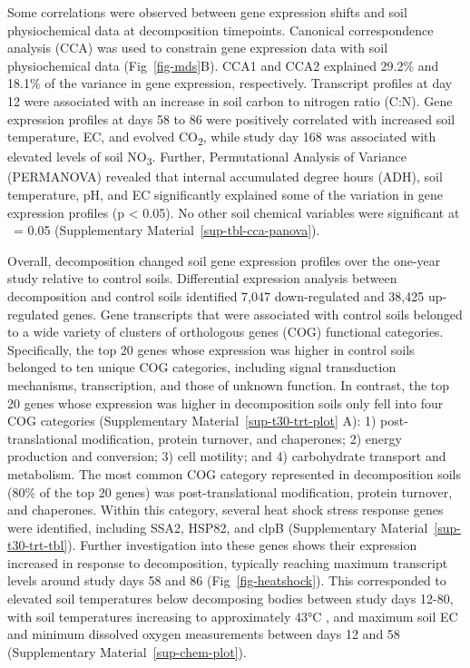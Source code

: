 \documentclass[
  sn-nature,
  lineno, referee]{sn-jnl}
\begin{document}
Some correlations were observed between gene expression shifts and soil
physiochemical data at decomposition timepoints. Canonical
correspondence analysis (CCA) was used to constrain gene expression data
with soil physiochemical data (Fig~\ref{fig-mds}B). CCA1 and CCA2
explained 29.2\% and 18.1\% of the variance in gene expression,
respectively. Transcript profiles at day 12 were associated with an
increase in soil carbon to nitrogen ratio (C:N). Gene expression
profiles at days 58 to 86 were positively correlated with increased soil
temperature, EC, and evolved CO\textsubscript{2}, while study day 168
was associated with elevated levels of soil NO\textsubscript{3}.
Further, Permutational Analysis of Variance (PERMANOVA) revealed that
internal accumulated degree hours (ADH), soil temperature, pH, and EC
significantly explained some of the variation in gene expression
profiles (p \textless{} 0.05). No other soil chemical variables were
significant at \textalpha~= 0.05
(Supplementary Material~\ref{sup-tbl-cca-panova}).

Overall, decomposition changed soil gene expression profiles over the
one-year study relative to control soils. Differential expression
analysis between decomposition and control soils identified 7,047
down-regulated and 38,425 up-regulated genes. Gene transcripts that were
associated with control soils belonged to a wide variety of clusters of
orthologous genes (COG) functional categories. Specifically, the top 20
genes whose expression was higher in control soils belonged to ten
unique COG categories, including signal transduction mechanisms,
transcription, and those of unknown function. In contrast, the top 20
genes whose expression was higher in decomposition soils only fell into
four COG categories (Supplementary Material~\ref{sup-t30-trt-plot} A):
1) post-translational modification, protein turnover, and chaperones; 2)
energy production and conversion; 3) cell motility; and 4) carbohydrate
transport and metabolism. The most common COG category represented in
decomposition soils (80\% of the top 20 genes) was post-translational
modification, protein turnover, and chaperones. Within this category,
several heat shock stress response genes were identified, including
SSA2, HSP82, and clpB (Supplementary Material~\ref{sup-t30-trt-tbl}).
Further investigation into these genes shows their expression increased
in response to decomposition, typically reaching maximum transcript
levels around study days 58 and 86 (Fig~\ref{fig-heatshock}). This
corresponded to elevated soil temperatures below decomposing bodies
between study days 12-80, with soil temperatures increasing to
approximately 43°C \citep{taylor_transient_2024}, and maximum soil EC
and minimum dissolved oxygen measurements between days 12 and 58
(Supplementary Material~\ref{sup-chem-plot}).
\end{document}
